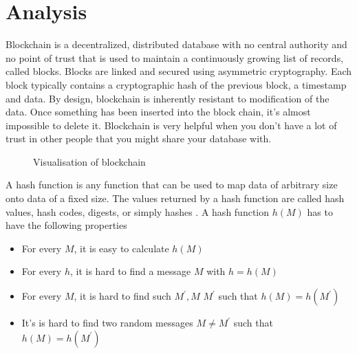 \chapter{Analysis}

Blockchain is a decentralized, distributed database with no central authority and no point of trust \cite{hyperledger_whitepaper} that is used to maintain a continuously growing list of records, called blocks. Blocks are linked and secured using asymmetric cryptography. Each block typically contains a cryptographic hash of the previous block, a timestamp and  data. By design, blockchain is inherently resistant to modification of the data. Once something has been inserted into the block chain, it's almost impossible to delete it. Blockchain is very helpful when you don't have a lot of trust in other people that you might share your database with.

\begin{figure}[H]
    \begin{left}
        \begin{minipage}{\linewidth}
            \begin{left}
                \caption{Visualisation of blockchain \cite{pixel_privacy}}
                \label{obr 1.1}
            \end{left}
        \end{minipage}
    \end{left}
\end{figure}

A hash function is any function that can be used to map data of arbitrary size onto data of a fixed size. The values returned by a hash function are called hash values, hash codes, digests, or simply hashes \cite{wiki_hash}. A hash function $h(M)$ has to have the following properties \cite{paluch_hash}

\begin{center}
    \begin{itemize}
        \item For every $M$, it is easy to calculate $h(M)$
        \item For every $h$, it is hard to find a message $M$ with $h=h(M)$
        \item For every $M$, it is hard to find such $M^\prime,M$ \neq $M^\prime$ such that $h(M) = h(M^\prime)$
        \item It's is hard to find two random messages $M \neq M^\prime$ such that $h(M) =h(M^\prime)$
    \end{itemize}
\end{center}
\newpage

